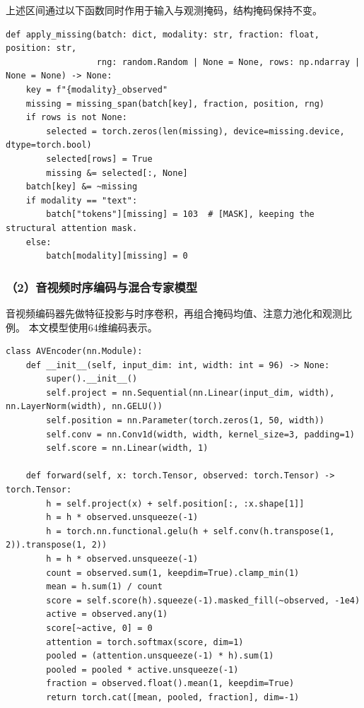 上述区间通过以下函数同时作用于输入与观测掩码，结构掩码保持不变。

\begin{lstlisting}
def apply_missing(batch: dict, modality: str, fraction: float, position: str,
                  rng: random.Random | None = None, rows: np.ndarray | None = None) -> None:
    key = f"{modality}_observed"
    missing = missing_span(batch[key], fraction, position, rng)
    if rows is not None:
        selected = torch.zeros(len(missing), device=missing.device, dtype=torch.bool)
        selected[rows] = True
        missing &= selected[:, None]
    batch[key] &= ~missing
    if modality == "text":
        batch["tokens"][missing] = 103  # [MASK], keeping the structural attention mask.
    else:
        batch[modality][missing] = 0
\end{lstlisting}

\subsubsection*{（2）音视频时序编码与混合专家模型}
音视频编码器先做特征投影与时序卷积，再组合掩码均值、注意力池化和观测比例。
本文模型使用64维编码表示。

\begin{lstlisting}
class AVEncoder(nn.Module):
    def __init__(self, input_dim: int, width: int = 96) -> None:
        super().__init__()
        self.project = nn.Sequential(nn.Linear(input_dim, width), nn.LayerNorm(width), nn.GELU())
        self.position = nn.Parameter(torch.zeros(1, 50, width))
        self.conv = nn.Conv1d(width, width, kernel_size=3, padding=1)
        self.score = nn.Linear(width, 1)

    def forward(self, x: torch.Tensor, observed: torch.Tensor) -> torch.Tensor:
        h = self.project(x) + self.position[:, :x.shape[1]]
        h = h * observed.unsqueeze(-1)
        h = torch.nn.functional.gelu(h + self.conv(h.transpose(1, 2)).transpose(1, 2))
        h = h * observed.unsqueeze(-1)
        count = observed.sum(1, keepdim=True).clamp_min(1)
        mean = h.sum(1) / count
        score = self.score(h).squeeze(-1).masked_fill(~observed, -1e4)
        active = observed.any(1)
        score[~active, 0] = 0
        attention = torch.softmax(score, dim=1)
        pooled = (attention.unsqueeze(-1) * h).sum(1)
        pooled = pooled * active.unsqueeze(-1)
        fraction = observed.float().mean(1, keepdim=True)
        return torch.cat([mean, pooled, fraction], dim=-1)
\end{lstlisting}

